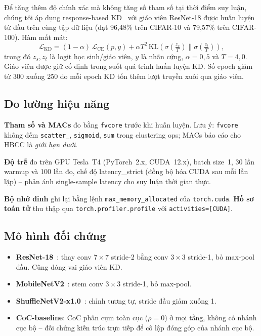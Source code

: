 \documentclass[journal]{IEEEtran}
\begin{document}
Để tăng thêm độ chính xác mà không tăng số tham số tại thời điểm
suy luận, chúng tôi áp dụng response-based KD~\cite{Hinton2015Distillation}
với giáo viên ResNet-18 được huấn luyện từ đầu trên cùng tập dữ liệu
(đạt 96,48\% trên CIFAR-10 và 79,57\% trên CIFAR-100). Hàm mất mát:
\begin{equation}
  \mathcal{L}_{\mathrm{KD}} = (1-\alpha)\,\mathcal{L}_{\mathrm{CE}}(p,y)
  + \alpha T^2\,\mathrm{KL}\!\left(
    \sigma\!\left(\tfrac{z_s}{T}\right)\Big\|
    \sigma\!\left(\tfrac{z_t}{T}\right)\right),
  \label{eq:kd}
\end{equation}
trong đó $z_s, z_t$ là logit học sinh/giáo viên, $y$ là nhãn cứng,
$\alpha{=}0{,}5$ và $T{=}4{,}0$. Giáo viên được giữ cố định trong
suốt quá trình huấn luyện KD. Số epoch giảm từ 300 xuống 250 do
mỗi epoch KD tốn thêm lượt truyền xuôi qua giáo viên.

\subsection{Đo lường hiệu năng}

\textbf{Tham số và MACs} đo bằng \texttt{fvcore} trước khi huấn
luyện. Lưu ý: \texttt{fvcore} không đếm \texttt{scatter\_},
\texttt{sigmoid}, \texttt{sum} trong clustering ops; MACs báo cáo
cho HBCC là \emph{giới hạn dưới}.

\textbf{Độ trễ} đo trên GPU Tesla~T4 (PyTorch~2.x, CUDA~12.x),
batch size~1, 30 lần warmup và 100 lần đo, chế độ latency\_strict
(đồng bộ hóa CUDA sau mỗi lần lặp) -- phản ánh single-sample
latency cho suy luận thời gian thực.

\textbf{Bộ nhớ đỉnh} ghi lại bằng lệnh \texttt{max\_memory\_\allowbreak allocated}
của \texttt{torch.cuda}. \textbf{Hồ sơ toán tử} thu thập qua
\texttt{torch.profiler\allowbreak.profile} với
\texttt{activities=[CUDA]}.

\subsection{Mô hình đối chứng}

\begin{itemize}
  \item \textbf{ResNet-18}~\cite{He2016ResNet}: thay conv
        $7\!\times\!7$ stride-2 bằng conv $3\!\times\!3$ stride-1,
        bỏ max-pool đầu. Cũng đóng vai giáo viên KD.
  \item \textbf{MobileNetV2}~\cite{Sandler2018MobileNetV2}: stem
        conv $3\!\times\!3$ stride-1, bỏ max-pool.
  \item \textbf{ShuffleNetV2-x1.0}~\cite{Ma2018ShuffleNetV2}:
        chỉnh tương tự, stride đầu giảm xuống 1.
  \item \textbf{CoC-baseline}: CoC phân cụm toàn cục ($\rho{=}0$)
        ở mọi tầng, không có nhánh cục bộ -- đối chứng kiến trúc
        trực tiếp để cô lập đóng góp của nhánh cục bộ.
\end{itemize}
\end{document}
